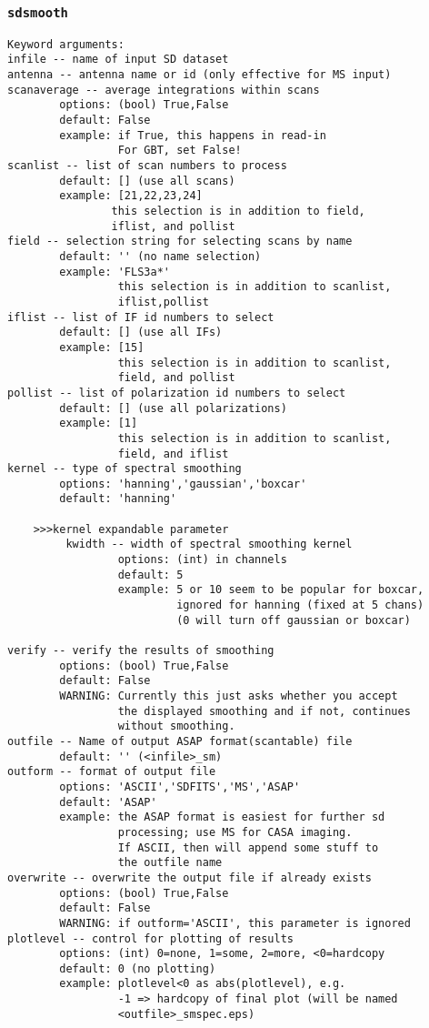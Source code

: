 \subsubsection{{\tt sdsmooth}}
\label{section:sd.sdtasks.tasks.sdsmooth}

\begin{verbatim}
Keyword arguments:
infile -- name of input SD dataset
antenna -- antenna name or id (only effective for MS input)
scanaverage -- average integrations within scans
        options: (bool) True,False
        default: False
        example: if True, this happens in read-in
                 For GBT, set False!
scanlist -- list of scan numbers to process
        default: [] (use all scans)
        example: [21,22,23,24]
                this selection is in addition to field,
                iflist, and pollist
field -- selection string for selecting scans by name
        default: '' (no name selection)
        example: 'FLS3a*'
                 this selection is in addition to scanlist,
                 iflist,pollist
iflist -- list of IF id numbers to select
        default: [] (use all IFs)
        example: [15]
                 this selection is in addition to scanlist,
                 field, and pollist
pollist -- list of polarization id numbers to select
        default: [] (use all polarizations)
        example: [1]
                 this selection is in addition to scanlist,
                 field, and iflist
kernel -- type of spectral smoothing
        options: 'hanning','gaussian','boxcar'
        default: 'hanning'
        
    >>>kernel expandable parameter
         kwidth -- width of spectral smoothing kernel
                 options: (int) in channels
                 default: 5
                 example: 5 or 10 seem to be popular for boxcar,
                          ignored for hanning (fixed at 5 chans)
                          (0 will turn off gaussian or boxcar)
                          
verify -- verify the results of smoothing
        options: (bool) True,False
        default: False
        WARNING: Currently this just asks whether you accept
                 the displayed smoothing and if not, continues
                 without smoothing.
outfile -- Name of output ASAP format(scantable) file
        default: '' (<infile>_sm)
outform -- format of output file
        options: 'ASCII','SDFITS','MS','ASAP'
        default: 'ASAP'
        example: the ASAP format is easiest for further sd
                 processing; use MS for CASA imaging.
                 If ASCII, then will append some stuff to
                 the outfile name
overwrite -- overwrite the output file if already exists
        options: (bool) True,False
        default: False
        WARNING: if outform='ASCII', this parameter is ignored
plotlevel -- control for plotting of results
        options: (int) 0=none, 1=some, 2=more, <0=hardcopy
        default: 0 (no plotting)
        example: plotlevel<0 as abs(plotlevel), e.g.
                 -1 => hardcopy of final plot (will be named
                 <outfile>_smspec.eps)
\end{verbatim}


